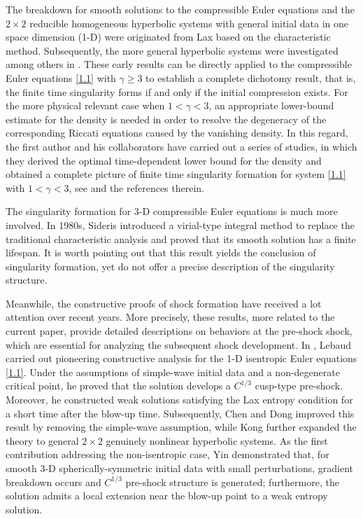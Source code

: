 \documentclass[11pt,reqno]{article}
\numberwithin{equation}{section}
\begin{document}
The breakdown for smooth solutions to
the compressible Euler equations and the $2\times2$ reducible homogeneous hyperbolic systems with general initial data in one space dimension (1-D) were originated from Lax \cite{Lax} based on the characteristic method.
Subsequently, the more general hyperbolic systems were investigated among others in \cite{John, Liu1, Liu2, Maj}. These early results can be directly applied to the compressible Euler equations \eqref{1.1} with $\gamma\geq3$ to establish a complete dichotomy result, that is, the finite time singularity forms if and only if the initial compression exists. For the more physical relevant case when $1<\gamma<3$, an appropriate lower-bound estimate for the density is needed in order to resolve the degeneracy of the corresponding Riccati equations caused by the vanishing density. In this regard, the first author and his collaborators have carried out
a series of studies, in which they derived the optimal time-dependent lower bound for the density and obtained a complete picture of finite time singularity formation for system \eqref{1.1} with $1<\gamma<3$, see \cite{Chen1, Chen2, Chen3, Chen4} and the references therein.

The singularity formation for 3-D compressible Euler equations is much more involved. In 1980s, Sideris \cite{Sid} introduced a  virial-type integral method to replace the traditional characteristic analysis and proved that its smooth solution has a finite lifespan. It is worth pointing out that this result yields the conclusion of singularity formation, yet do not offer a precise description of the singularity structure.

Meanwhile, the constructive proofs of shock formation have received a lot attention over recent years. More precisely, these results, more related to the current paper, provide detailed descriptions on behaviors at the pre-shock shock, which are essential for analyzing the subsequent shock development.
In \cite{Leb}, Lebaud carried out pioneering constructive analysis for the 1-D isentropic Euler equations \eqref{1.1}. Under the assumptions of simple-wave initial data and a non-degenerate critical point, he proved that the solution develops a \(C^{1/3}\) cusp-type pre-shock. Moreover, he constructed weak solutions satisfying the Lax entropy condition for a short time after the blow-up time. Subsequently, Chen and Dong \cite{CD} improved this result by removing the simple-wave assumption, while Kong \cite{Kong} further expanded the theory to general \(2\times 2\) genuinely nonlinear hyperbolic systems. As the first contribution addressing the non-isentropic case, Yin \cite{Yin} demonstrated that, for smooth 3-D spherically-symmetric initial data with small perturbations, gradient breakdown occurs and \(C^{1/3}\) pre-shock structure is generated; furthermore, the solution admits a local extension near the blow-up point to a weak entropy solution.
\end{document}
